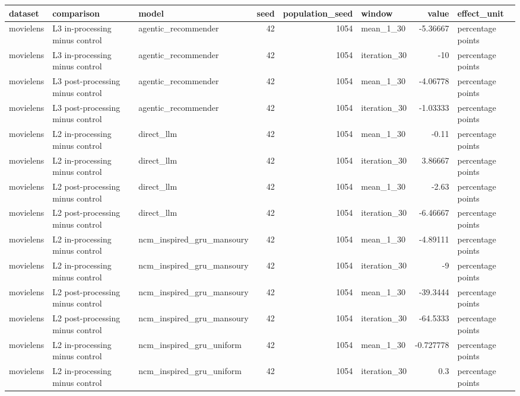 \begin{table}[htbp!]
\centering
\small
\setlength{\tabcolsep}{3pt}
\renewcommand{\arraystretch}{1.1}
\begin{tabular}{lllrrlrl}
\hline
dataset & comparison & model & seed & population\_seed & window & value & effect\_unit \\
\hline
movielens & L3 in-processing minus control & agentic\_recommender & 42 & 1054 & mean\_1\_30 & -5.36667 & percentage points \\
movielens & L3 in-processing minus control & agentic\_recommender & 42 & 1054 & iteration\_30 & -10 & percentage points \\
movielens & L3 post-processing minus control & agentic\_recommender & 42 & 1054 & mean\_1\_30 & -4.06778 & percentage points \\
movielens & L3 post-processing minus control & agentic\_recommender & 42 & 1054 & iteration\_30 & -1.03333 & percentage points \\
movielens & L2 in-processing minus control & direct\_llm & 42 & 1054 & mean\_1\_30 & -0.11 & percentage points \\
movielens & L2 in-processing minus control & direct\_llm & 42 & 1054 & iteration\_30 & 3.86667 & percentage points \\
movielens & L2 post-processing minus control & direct\_llm & 42 & 1054 & mean\_1\_30 & -2.63 & percentage points \\
movielens & L2 post-processing minus control & direct\_llm & 42 & 1054 & iteration\_30 & -6.46667 & percentage points \\
movielens & L2 in-processing minus control & ncm\_inspired\_gru\_mansoury & 42 & 1054 & mean\_1\_30 & -4.89111 & percentage points \\
movielens & L2 in-processing minus control & ncm\_inspired\_gru\_mansoury & 42 & 1054 & iteration\_30 & -9 & percentage points \\
movielens & L2 post-processing minus control & ncm\_inspired\_gru\_mansoury & 42 & 1054 & mean\_1\_30 & -39.3444 & percentage points \\
movielens & L2 post-processing minus control & ncm\_inspired\_gru\_mansoury & 42 & 1054 & iteration\_30 & -64.5333 & percentage points \\
movielens & L2 in-processing minus control & ncm\_inspired\_gru\_uniform & 42 & 1054 & mean\_1\_30 & -0.727778 & percentage points \\
movielens & L2 in-processing minus control & ncm\_inspired\_gru\_uniform & 42 & 1054 & iteration\_30 & 0.3 & percentage points \\

\end{tabular}
\end{table}

